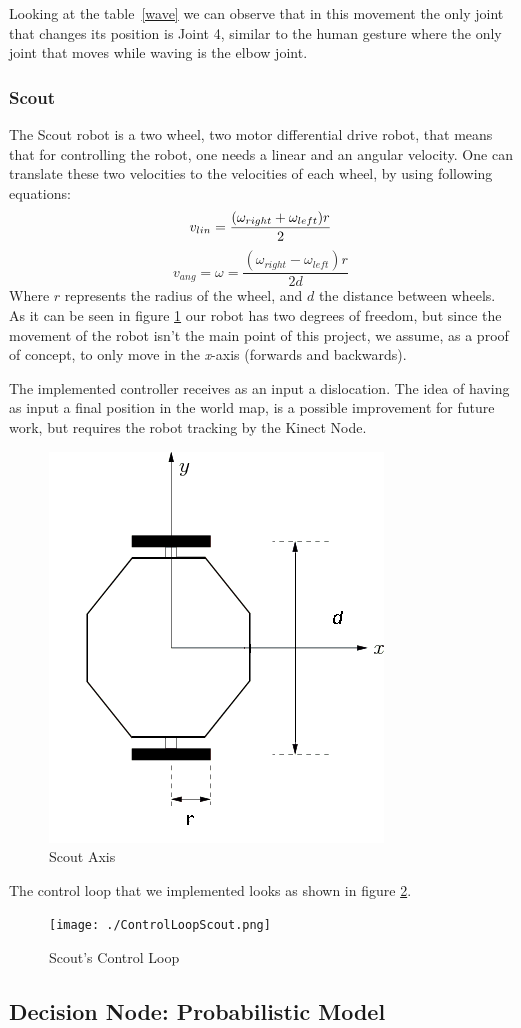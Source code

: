 Looking at the table~\ref{wave} we can observe that in this movement the only joint that changes its position is Joint 4, similar to the human gesture where the only joint that moves while waving is the elbow joint.

\subsubsection{Scout}
The Scout robot is a two wheel, two motor differential drive robot, that means that for controlling the robot, one needs a linear and an angular velocity. One can translate these two velocities to the velocities of each wheel, by using following equations:
\begin{equation}
v_{lin} = \frac{(\omega_{right}+\omega_{left})r}{2} \\
\end{equation}
\begin{equation}
v_{ang} = \omega = \frac{(\omega_{right}-\omega_{left})r}{2d}
\end{equation}
Where $r$ represents the radius of the wheel, and $d$ the distance between wheels.
As it can be seen in figure \ref{fig:scout_axis} our robot has two degrees of freedom, but since the movement of the robot isn't the main point of this project, we assume, as a proof of concept, to only move in the \textit{x}-axis (forwards and backwards).

The implemented controller receives as an input a dislocation. The idea of having as input a final position in the world map, is a possible improvement for future work, but requires the robot tracking by the Kinect Node.

\begin{figure}[!h]
    \centering
    \includegraphics[width=0.5\columnwidth]{./ScoutAxis.png}
    \caption{Scout Axis}
    \label{fig:scout_axis}
\end{figure}
The control loop that we implemented looks as shown in figure \ref{fig:scout_loop}.
\begin{figure}[!h]
    \centering
    \texttt{[image: ./ControlLoopScout.png]}
    \caption{Scout's Control Loop}
    \label{fig:scout_loop}
\end{figure}

\subsection{Decision Node: Probabilistic Model}
